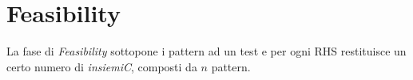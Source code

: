 \section{Feasibility}
La fase di \emph{Feasibility} sottopone i pattern ad un test e per ogni RHS restituisce un certo numero di \emph{insiemiC}, composti da $n$ pattern.